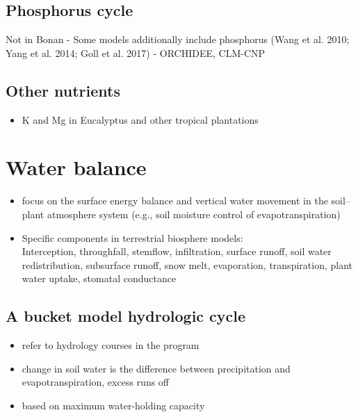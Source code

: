 \documentclass[12pt,oneside]{book}
\providecommand{\tightlist}{%
  \setlength{\itemsep}{0pt}\setlength{\parskip}{0pt}}
\begin{document}
\subsection{Phosphorus cycle}\label{phosphorus-cycle}

Not in Bonan - Some models additionally include phosphorus (Wang et al.
2010; Yang et al. 2014; Goll et al. 2017) - ORCHIDEE, CLM-CNP

\subsection{Other nutrients}\label{other-nutrients}

\begin{itemize}
\tightlist
\item
  K and Mg in Eucalyptus and other tropical plantations
\end{itemize}

\section{Water balance}\label{water-balance}

\begin{itemize}
\item
  focus on the surface energy balance and vertical water movement in the
  soil--plant atmosphere system (e.g., soil moisture control of
  evapotranspiration)
\item
  Specific components in terrestrial biosphere models:\\
  Interception, throughfall, stemflow, infiltration, surface runoff,
  soil water redistribution, subsurface runoff, snow melt, evaporation,
  transpiration, plant water uptake, stomatal conductance
\end{itemize}

\subsection{A bucket model hydrologic
cycle}\label{a-bucket-model-hydrologic-cycle}

\begin{itemize}
\tightlist
\item
  refer to hydrology courses in the program
\item
  change in soil water is the difference between precipitation and
  evapotranspiration, excess runs off
\item
  based on maximum water-holding capacity
\end{itemize}
\end{document}
